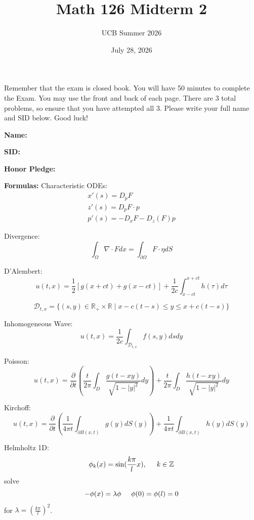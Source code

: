 \documentclass{article}
\newcommand{\Z}{{\mathbb{Z}}}
\newcommand{\R}{{\mathbb{R}}}
\newcommand{\pd}{\partial}
\begin{document}
\title{Math 126 Midterm 2}
\author{UCB Summer 2026}
\date{July 28, 2026}
\maketitle

Remember that the exam is closed book. You will have 50 minutes to complete the Exam. You may use the front and back of each page. There are 3 total problems, so ensure that you have attempted all 3. Please write your full name and SID below. Good luck!

\vspace{1 cm}

\textbf{Name:} 

\vspace{1 cm}

\textbf{SID:}

\vspace{1 cm}

\textbf{Honor Pledge:}

\vspace{1 cm}

\textbf{Formulas:}
Characteristic ODEs: 
\begin{align*}
	x'(s) = D_p F \\
	z'(s) = D_p F \cdot p \\
	p'(s) = -D_{x} F - D_{z}(F) p
\end{align*}

Divergence: $$\int_{\Omega} \nabla \cdot F dx = \int_{\pd \Omega} F \cdot \eta dS$$

D'Alembert: $$u(t,x) = \frac{1}{2} \left[g(x+ct) + g(x-ct) \right] + \frac{1}{2c} \int_{x-ct}^{x+ct} h(\tau) d\tau $$

$$\mathcal{D}_{t,x} = \{ (s,y) \in \R_{+} \times \R \mid x-c(t-s) \leq y \leq x+c(t-s)\}$$

Inhomogeneous Wave: $$u(t,x) = \frac{1}{2c} \int_{\mathcal{D}_{t,x}} f(s,y) dsdy$$

Poisson: $$u(t,x) = \frac{\pd}{\pd t} \left( \frac{t}{2\pi} \int_{D} \frac{g(t-xy)}{\sqrt{1 - |y|^{2}}} dy\right) + \frac{t}{2\pi} \int_{D} \frac{h(t-xy)}{\sqrt{1-|y|^{2}}} dy$$

Kirchoff: $$ u(t,x) = \frac{\pd}{\pd t} \left(\frac{1}{4 \pi t} \int_{\pd B(x,t)} g(y) dS(y) \right) + \frac{1}{4\pi t} \int_{\pd B(x,t)} h(y) dS(y)$$

Helmholtz 1D: $$\phi_{k}(x) = \sin(\frac{k\pi}{l}x), \hspace{0.5 cm} k \in \Z$$
solve $$-\phi(x) = \lambda \phi \hspace{0.5 cm} \phi(0) = \phi(l) = 0$$ for $\lambda = (\frac{k\pi}{l})
^{2}$.
\end{document}
